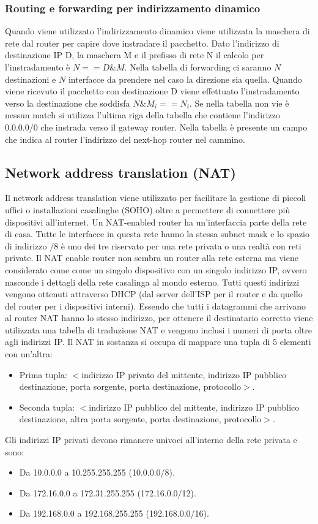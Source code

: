 \subsubsection{Routing e forwarding per indirizzamento dinamico}
Quando viene utilizzato l'indirizzamento dinamico viene utilizzata la maschera di rete dal router per capire dove instradare il pacchetto. Dato l'indirizzo di destinazione IP D, la maschera M e il prefisso di rete
N il calcolo per l'instradamento \`e $N== D \& M$. Nella tabella di forwarding ci saranno $N$ destinazioni e $N$ interfacce da prendere nel caso la direzione sia quella. Quando viene ricevuto il pacchetto con
destinazione D viene effettuato l'instradamento verso la destinazione che soddisfa $N \& M_i==N_i$. Se nella tabella non vie \`e nessun match si utilizza l'ultima riga della tabella che contiene l'indirizzo 
0.0.0.0/0 che instrada verso il gateway router. Nella tabella \`e presente un campo che indica al router l'indirizzo del next-hop router nel cammino. 
\subsection{Network address translation (NAT)}
Il network address translation viene utilizzato per facilitare la gestione di piccoli uffici o installazioni casalinghe (SOHO) oltre a permettere di 
connettere pi\`u dispositivi all'internet. Un NAT-enabled router ha un'interfaccia parte della rete di casa. Tutte le interfacce in questa rete hanno la 
stessa subnet mask e lo spazio di indirizzo $/8$ \`e uno dei tre riservato per una rete privata o una realt\`a con reti private. Il NAT enable router non
sembra un router alla rete esterna ma viene considerato come come un singolo dispositivo con un singolo indirizzo IP, ovvero nasconde i dettagli della rete
casalinga al mondo esterno. Tutti questi indirizzi vengono ottenuti attraverso DHCP (dal server dell'ISP per il router e da quello del router per i 
dispositivi interni). Essendo che tutti i datagrammi che arrivano al router NAT hanno lo stesso indirizzo, per ottenere il destinatario corretto viene 
utilizzata una tabella di traduzione NAT e vengono inclusi i numeri di porta oltre agli indirizzi IP. Il NAT in sostanza si occupa di mappare una tupla di $5$ elementi con un'altra:
\begin{itemize}
\item Prima tupla: $<$indirizzo IP privato del mittente, indirizzo IP pubblico destinazione, porta sorgente, porta destinazione, protocollo$>$.
\item Seconda tupla: $<$indirizzo IP pubblico del mittente, indirizzo IP pubblico destinazione, altra porta sorgente, porta destinazione, protocollo$>$.
\end{itemize}
Gli indirizzi IP privati devono rimanere univoci all'interno della rete privata  e sono:
\begin{itemize}
\item Da 10.0.0.0 a 10.255.255.255 (10.0.0.0/8).
\item Da 172.16.0.0 a 172.31.255.255 (172.16.0.0/12).
\item Da 192.168.0.0 a 192.168.255.255 (192.168.0.0/16).
\end{itemize}
